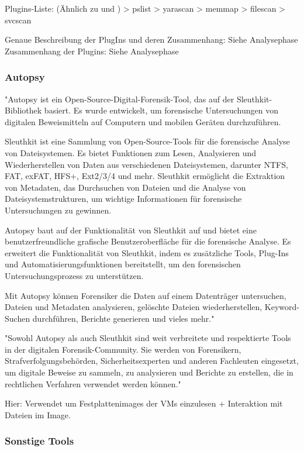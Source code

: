	Plugins-Liste: (Ähnlich zu \cite{Hariharan} und \cite{Dayalamurthy.2013})
	  > pslist	
	  > yarascan		
	  > memmap	 	
	  > filescan
	  > svcscan
		
	Genaue Beschreibung der PlugIns und deren Zusammenhang: Siehe Analysephase		
	Zusammenhang der Plugins: Siehe Analysephase

\subsubsection*{Autopsy}
	"Autopsy ist ein Open-Source-Digital-Forensik-Tool, das auf der Sleuthkit-Bibliothek basiert. Es wurde entwickelt, um forensische Untersuchungen von digitalen Beweismitteln auf Computern und mobilen Geräten durchzuführen.

	Sleuthkit ist eine Sammlung von Open-Source-Tools für die forensische Analyse von Dateisystemen. Es bietet Funktionen zum Lesen, Analysieren und Wiederherstellen von Daten aus verschiedenen Dateisystemen, darunter NTFS, FAT, exFAT, HFS+, Ext2/3/4 und mehr. Sleuthkit ermöglicht die Extraktion von Metadaten, das Durchsuchen von Dateien und die Analyse von Dateisystemstrukturen, um wichtige Informationen für forensische Untersuchungen zu gewinnen.
	
	Autopsy baut auf der Funktionalität von Sleuthkit auf und bietet eine benutzerfreundliche grafische Benutzeroberfläche für die forensische Analyse. Es erweitert die Funktionalität von Sleuthkit, indem es zusätzliche Tools, Plug-Ins und Automatisierungsfunktionen bereitstellt, um den forensischen Untersuchungsprozess zu unterstützen.
	
	Mit Autopsy können Forensiker die Daten auf einem Datenträger untersuchen, Dateien und Metadaten analysieren, gelöschte Dateien wiederherstellen, Keyword-Suchen durchführen, Berichte generieren und vieles mehr."

	"Sowohl Autopsy als auch Sleuthkit sind weit verbreitete und respektierte Tools in der digitalen Forensik-Community. Sie werden von Forensikern, Strafverfolgungsbehörden, Sicherheitsexperten und anderen Fachleuten eingesetzt, um digitale Beweise zu sammeln, zu analysieren und Berichte zu erstellen, die in rechtlichen Verfahren verwendet werden können."
	
	Hier: Verwendet um Festplattenimages der VMs einzulesen + Interaktion mit Dateien im Image. 

\subsubsection*{Sonstige Tools}

